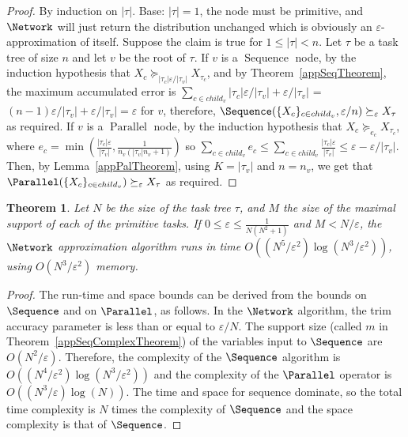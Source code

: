 \documentclass{article}
\newtheorem{theorem}{Theorem}
\begin{document}
\begin{proof} 
By induction on $|\tau|$. 
Base: $|\tau|=1$, the node must be primitive, and $\Network$ will just return the distribution unchanged which is obviously an $\varepsilon$-approximation
of itself. Suppose the claim is true for $1 \leq |\tau| < n$. Let $\tau$ be a task tree of size $n$ and
let $v$ be the root of $\tau$. If $v$ is a $\operatorname{Sequence}$ node, by the induction hypothesis that $X_c\succeq_{|\tau_c|\varepsilon/|\tau_v|} X_{\tau_c}$, and by Theorem~\ref{appSeqTheorem}, the maximum accumulated error is 
$\sum_{c \in child_v}
{|\tau_c|\varepsilon}/|\tau_v| + {\varepsilon}/|\tau_v|$ = $(n-1)\varepsilon/|\tau_v|+{\varepsilon}/|\tau_v|= \varepsilon$ for $v$, therefore, $\Sequence(\{X_c\}_{c\in child_v}, {\varepsilon}/{n}) \succeq_\varepsilon X_\tau$ as required. 
If $v$ is a $\operatorname{Parallel}$ node, by the induction hypothesis that $X_c  \succeq_{e_c} X_{\tau_c}$, where $e_c = \min(\frac{|\tau_{c}|\varepsilon}{|\tau_v|}, \frac{1}{n_v (|\tau_v| n_v+1)})$ 
so $\sum_{c\in child_v} e_c \leq   \sum_{c\in child_v} \frac{|\tau_{c}|\varepsilon}{|\tau_v|}  \leq \varepsilon  - \varepsilon/ |\tau_v|  $. Then, by Lemma~\ref{appPalTheorem}, using $K=|\tau_v|$ and $n=n_v$, we get that $\Parallel(\{X_c\}_{c\in child_v})\succeq_\varepsilon  X_\tau$ as required. 
\end{proof}

\begin{theorem}\label{th:TTalgcomplexity}
Let  $N$ be the size of the  task tree  $\tau$,  and $M$ the size of the maximal support of each of the primitive tasks.
If $0 \leq \varepsilon \leq \frac{1}{N (N^2+1)}$ and $M < N/\varepsilon$, the  $\Network$ approximation algorithm 
runs in time $O((N^5 /\varepsilon^2)\log(N^3/\varepsilon^2))$, using
$O(N^3/\varepsilon^2) $ memory.
\end{theorem}

\begin{proof}
The run-time and space bounds can be derived from the bounds on $\Sequence$ and on $\Parallel$, as follows. In the $\Network$ algorithm, the trim accuracy parameter is less than or equal to ${\varepsilon}/{N}$. 
The support size (called $m$ in Theorem~\ref{appSeqComplexTheorem}) of the variables input to $\Sequence$ are $O(N^2/\varepsilon)$.
Therefore, the complexity of the $\Sequence$ algorithm is 
$O((N^4 /\varepsilon^2)\log(N^3/\varepsilon^2))$ and the complexity of the $\Parallel$ operator is $O((N^3/\varepsilon)\log(N))$. The time and space for sequence dominate, so the total time complexity is $N$ times the complexity of $\Sequence$ and the space complexity is that of $\Sequence$.
\end{proof}
\end{document}

